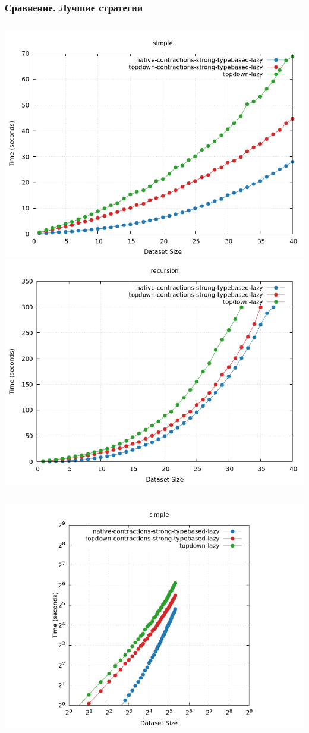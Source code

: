 \documentclass{beamer}
\begin{document}
\begin{frame}\frametitle{Сравнение. Лучшие стратегии}
  \begin{columns}
    \includegraphics[width=\textwidth]{winners_simple.png}
    \includegraphics[width=\textwidth]{winners_recursion.png}
  \end{columns}
  \begin{columns}
    \includegraphics[width=\textwidth]{loglog_simple.png}

\end{columns}
\end{frame}
\end{document}
